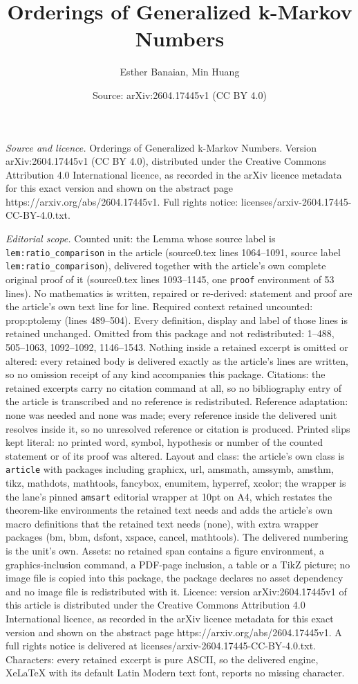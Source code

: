 \documentclass[10pt,a4paper]{amsart}
\title[Orderings of Generalized k-Markov Numbers]{Orderings of Generalized k-Markov Numbers}
\author{Esther Banaian, Min Huang}
\date{Source: arXiv:2604.17445v1 (CC BY 4.0)}
\begin{document}
\maketitle

\noindent\emph{Source and licence.} Orderings of Generalized k-Markov Numbers. Version arXiv:2604.17445v1 (CC BY 4.0), distributed under the Creative Commons Attribution 4.0 International licence, as recorded in the arXiv licence metadata for this exact version and shown on the abstract page https://arxiv.org/abs/2604.17445v1. Full rights notice: licenses/arxiv-2604.17445-CC-BY-4.0.txt.\par\smallskip

\noindent\textit{Editorial scope.} Counted unit: the Lemma whose source label is \texttt{lem:ratio\_comparison} in the article (source0.tex lines 1064--1091, source label \texttt{lem:ratio\_comparison}), delivered together with the article's own complete original proof of it (source0.tex lines 1093--1145, one \texttt{proof} environment of 53 lines). No mathematics is written, repaired or re-derived: statement and proof are the article's own text line for line. Required context retained uncounted: prop:ptolemy (lines 489--504). Every definition, display and label of those lines is retained unchanged. Omitted from this package and not redistributed: 1--488, 505--1063, 1092--1092, 1146--1543. Nothing inside a retained excerpt is omitted or altered: every retained body is delivered exactly as the article's lines are written, so no omission receipt of any kind accompanies this package. Citations: the retained excerpts carry no citation command at all, so no bibliography entry of the article is transcribed and no reference is redistributed. Reference adaptation: none was needed and none was made; every reference inside the delivered unit resolves inside it, so no unresolved reference or citation is produced. Printed slips kept literal: no printed word, symbol, hypothesis or number of the counted statement or of its proof was altered. Layout and class: the article's own class is \texttt{article} with packages including graphicx, url, amsmath, amssymb, amsthm, tikz, mathdots, mathtools, fancybox, enumitem, hyperref, xcolor; the wrapper is the lane's pinned \texttt{amsart} editorial wrapper at 10pt on A4, which restates the theorem-like environments the retained text needs and adds the article's own macro definitions that the retained text needs (none), with extra wrapper packages (bm, bbm, dsfont, xspace, cancel, mathtools). The delivered numbering is the unit's own. Assets: no retained span contains a figure environment, a graphics-inclusion command, a PDF-page inclusion, a table or a TikZ picture; no image file is copied into this package, the package declares no asset dependency and no image file is redistributed with it. Licence: version arXiv:2604.17445v1 of this article is distributed under the Creative Commons Attribution 4.0 International licence, as recorded in the arXiv licence metadata for this exact version and shown on the abstract page https://arxiv.org/abs/2604.17445v1. A full rights notice is delivered at licenses/arxiv-2604.17445-CC-BY-4.0.txt. Characters: every retained excerpt is pure ASCII, so the delivered engine, XeLaTeX with its default Latin Modern text font, reports no missing character.
\end{document}

